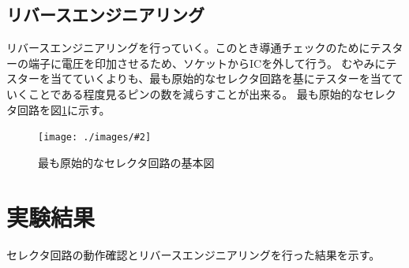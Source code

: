 \documentclass[a4paper,11pt,dvipdfmx]{jsarticle}
\newcommand{\Figure}[4]{
\begin{figure}[H]
\centering
\texttt{[image: ./images/\#2]}
\caption{#3}
\label{fig:#4}
\end{figure}
}
\begin{document}
\subsection{リバースエンジニアリング}
リバースエンジニアリングを行っていく。このとき導通チェックのためにテスターの端子に電圧を印加させるため、ソケットからICを外して行う。
むやみにテスターを当てていくよりも、最も原始的なセレクタ回路を基にテスターを当てていくことである程度見るピンの数を減らすことが出来る。
最も原始的なセレクタ回路を図\ref{fig:selector}に示す。
\Figure{0.8}{selector.png}{最も原始的なセレクタ回路の基本図}{selector}

\section{実験結果}
セレクタ回路の動作確認とリバースエンジニアリングを行った結果を示す。
\end{document}
